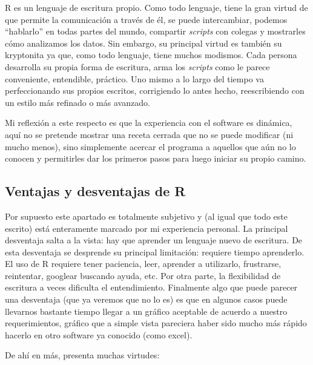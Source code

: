\documentclass[
  letterpaper,
  DIV=11,
  numbers=noendperiod]{scrartcl}
\begin{document}
R es un lenguaje de escritura propio. Como todo lenguaje, tiene la gran
virtud de que permite la comunicación a través de él, se puede
intercambiar, podemos ``hablarlo'' en todas partes del mundo, compartir
\emph{scripts} con colegas y mostrarles cómo analizamos los datos. Sin
embargo, su principal virtud es también su kryptonita ya que, como todo
lenguaje, tiene muchos modismos. Cada persona desarrolla su propia forma
de escritura, arma los \emph{scripts} como le parece conveniente,
entendible, práctico. Uno mismo a lo largo del tiempo va perfeccionando
sus propios escritos, corrigiendo lo antes hecho, reescribiendo con un
estilo más refinado o más avanzado.

Mi reflexión a este respecto es que la experiencia con el software es
dinámica, aquí no se pretende mostrar una receta cerrada que no se puede
modificar (ni mucho menos), sino simplemente acercar el programa a
aquellos que aún no lo conocen y permitirles dar los primeros pasos para
luego iniciar su propio camino.

\hypertarget{ventajas-y-desventajas-de-r}{%
\subsection{Ventajas y desventajas de
R}\label{ventajas-y-desventajas-de-r}}

Por supuesto este apartado es totalmente subjetivo y (al igual que todo
este escrito) está enteramente marcado por mi experiencia personal. La
principal desventaja salta a la vista: hay que aprender un lenguaje
nuevo de escritura. De esta desventaja se desprende su principal
limitación: requiere tiempo aprenderlo. El uso de R requiere tener
paciencia, leer, aprender a utilizarlo, frustrarse, reintentar, googlear
buscando ayuda, etc. Por otra parte, la flexibilidad de escritura a
veces dificulta el entendimiento. Finalmente algo que puede parecer una
desventaja (que ya veremos que no lo es) es que en algunos casos puede
llevarnos bastante tiempo llegar a un gráfico aceptable de acuerdo a
nuestro requerimientos, gráfico que a simple vista pareciera haber sido
mucho más rápido hacerlo en otro software ya conocido (como excel).

De ahí en más, presenta muchas virtudes:
\end{document}
